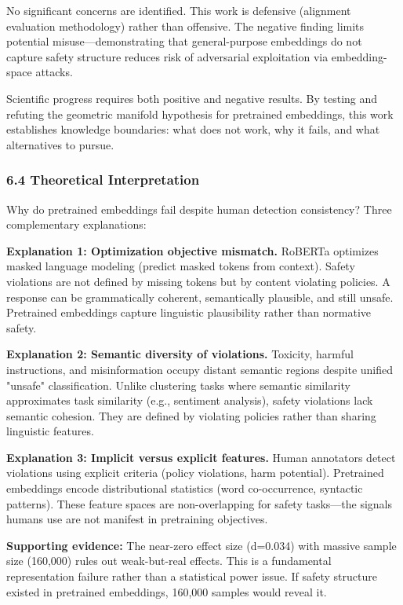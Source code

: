 No significant concerns are identified. This work is defensive (alignment evaluation methodology) rather than offensive. The negative finding limits potential misuse—demonstrating that general-purpose embeddings do not capture safety structure reduces risk of adversarial exploitation via embedding-space attacks.

Scientific progress requires both positive and negative results. By testing and refuting the geometric manifold hypothesis for pretrained embeddings, this work establishes knowledge boundaries: what does not work, why it fails, and what alternatives to pursue.

\subsubsection{6.4 Theoretical Interpretation}

Why do pretrained embeddings fail despite human detection consistency? Three complementary explanations:

\textbf{Explanation 1: Optimization objective mismatch.} RoBERTa optimizes masked language modeling (predict masked tokens from context). Safety violations are not defined by missing tokens but by content violating policies. A response can be grammatically coherent, semantically plausible, and still unsafe. Pretrained embeddings capture linguistic plausibility rather than normative safety.

\textbf{Explanation 2: Semantic diversity of violations.} Toxicity, harmful instructions, and misinformation occupy distant semantic regions despite unified "unsafe" classification. Unlike clustering tasks where semantic similarity approximates task similarity (e.g., sentiment analysis), safety violations lack semantic cohesion. They are defined by violating policies rather than sharing linguistic features.

\textbf{Explanation 3: Implicit versus explicit features.} Human annotators detect violations using explicit criteria (policy violations, harm potential). Pretrained embeddings encode distributional statistics (word co-occurrence, syntactic patterns). These feature spaces are non-overlapping for safety tasks—the signals humans use are not manifest in pretraining objectives.

\textbf{Supporting evidence:} The near-zero effect size (d=0.034) with massive sample size (160,000) rules out weak-but-real effects. This is a fundamental representation failure rather than a statistical power issue. If safety structure existed in pretrained embeddings, 160,000 samples would reveal it.
